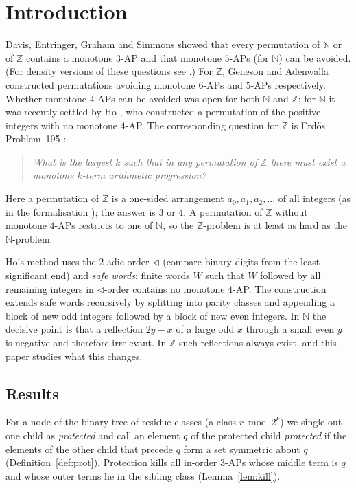 \documentclass[11pt]{amsart}
\theoremstyle{definition}
\theoremstyle{remark}
\newcommand{\Z}{\mathbb{Z}}
\newcommand{\N}{\mathbb{N}}
\begin{document}
\section{Introduction}

Davis, Entringer, Graham and Simmons \cite{DEGS} showed that every permutation of $\N$ or of $\Z$ contains a monotone $3$-AP and that monotone $5$-APs (for $\N$) can be avoided. (For density versions of these questions see \cite{LV11,Ge26}.) For $\Z$, Geneson \cite{Ge19} and Adenwalla \cite{Ad22} constructed permutations avoiding monotone $6$-APs and $5$-APs respectively. Whether monotone $4$-APs can be avoided was open for both $\N$ and $\Z$; for $\N$ it was recently settled by Ho \cite{Ho26}, who constructed a permutation of the positive integers with no monotone $4$-AP. The corresponding question for $\Z$ is Erd\H{o}s Problem~195 \cite{EP195}:

\begin{quote}
\emph{What is the largest $k$ such that in any permutation of $\Z$ there must exist a monotone $k$-term arithmetic progression?}
\end{quote}

Here a permutation of $\Z$ is a one-sided arrangement $a_0,a_1,a_2,\dots$ of all integers (as in the formalisation \cite{FC195}); the answer is $3$ or $4$. A permutation of $\Z$ without monotone $4$-APs restricts to one of $\N$, so the $\Z$-problem is at least as hard as the $\N$-problem.

Ho's method uses the $2$-adic order $\lhd$ (compare binary digits from the least significant end) and \emph{safe words}: finite words $W$ such that $W$ followed by all remaining integers in $\lhd$-order contains no monotone $4$-AP. The construction extends safe words recursively by splitting into parity classes and appending a block of new odd integers followed by a block of new even integers. In $\N$ the decisive point is that a reflection $2y-x$ of a large odd $x$ through a small even $y$ is negative and therefore irrelevant. In $\Z$ such reflections always exist, and this paper studies what this changes.

\subsection*{Results}
For a node of the binary tree of residue classes (a class $r\bmod 2^k$) we single out one child as \emph{protected} and call an element $q$ of the protected child \emph{protected} if the elements of the other child that precede $q$ form a set symmetric about $q$ (Definition~\ref{def:prot}). Protection kills all in-order $3$-APs whose middle term is $q$ and whose outer terms lie in the sibling class (Lemma~\ref{lem:kill}).
\end{document}
